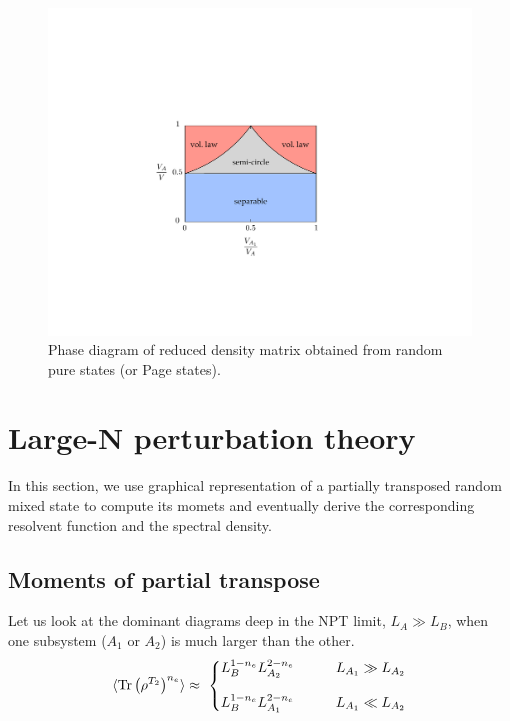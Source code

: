 \documentclass[aps,pra,groupedaddress,twocolumn,notitlepage,superscriptaddress,10pt]{revtex4-1}
\newcommand{\Tr}{\text{Tr}}
\begin{document}
\begin{figure}
\includegraphics[scale=0.6]{images/phase_diag.pdf}
\caption{\label{fig:phasediag} Phase diagram of reduced density matrix obtained from random pure states (or Page states).}
\end{figure}

\section{Large-N perturbation theory}
In this section, we use graphical representation of a partially transposed random mixed state to  compute its momets  and eventually derive the corresponding resolvent function and the spectral density.


\subsection{Moments of partial transpose}

Let us look at the dominant diagrams deep in the NPT limit, $L_A\gg L_B$, when one subsystem ($A_1$ or $A_2$) is much larger than the other. 
\begin{align}
    \braket{\Tr \left(\rho^{T_2}\right)^{n_e} } \approx \ 
    \left\{
    \begin{matrix}
    L_{B}^{1-n_e} L_{A_2}^{2-n_e} & \qquad  L_{A_1} \gg L_{A_2}
    \\
    \\
    L_{B}^{1-n_e} L_{A_1}^{2-n_e} & \qquad  L_{A_1} \ll L_{A_2}
    \end{matrix}
    \right.
\end{align}
\end{document}
